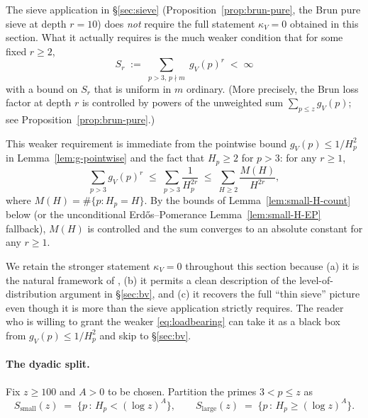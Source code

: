 \begin{remark}[Load-bearing requirement is weaker than $\kappa_{V} = 0$]
\label{rem:loadbearing}
The sieve application in \S\ref{sec:sieve}
(Proposition~\ref{prop:brun-pure}, the Brun pure sieve at depth $r = 10$)
does \emph{not} require the full statement $\kappa_{V} = 0$ obtained in
this section. What it actually requires is the much weaker condition
that for some fixed $r \geq 2$,
\begin{equation}\label{eq:loadbearing}
  S_{r} \;:=\; \sum_{p > 3, \, p \nmid m}\; g_{V}(p)^{r} \;<\; \infty
\end{equation}
with a bound on $S_{r}$ that is uniform in $m$ ordinary. (More precisely,
the Brun loss factor at depth $r$ is controlled by powers of the
unweighted sum $\sum_{p \leq z} g_{V}(p)$; see
Proposition~\ref{prop:brun-pure}.)

This weaker requirement is immediate from the pointwise bound
$g_{V}(p) \leq 1/H_{p}^{2}$ in Lemma~\ref{lem:g-pointwise} and the
fact that $H_{p} \geq 2$ for $p > 3$: for any $r \geq 1$,
\begin{equation}
  \sum_{p > 3} g_{V}(p)^{r}
  \;\leq\; \sum_{p > 3} \frac{1}{H_{p}^{2r}}
  \;\leq\; \sum_{H \geq 2} \frac{M(H)}{H^{2r}},
\end{equation}
where $M(H) = \#\{p : H_{p} = H\}$. By the bounds of
Lemma~\ref{lem:small-H-count} below (or the unconditional
Erd\H{o}s--Pomerance Lemma~\ref{lem:small-H-EP} fallback), $M(H)$ is
controlled and the sum converges to an absolute constant for any
$r \geq 1$.

We retain the stronger statement $\kappa_{V} = 0$ throughout this
section because (a) it is the natural framework of
\cite{HalberstamRichert1974}, (b) it permits a clean description of
the level-of-distribution argument in \S\ref{sec:bv}, and (c) it
recovers the full ``thin sieve'' picture even though it is more than
the sieve application strictly requires. The reader who is willing to
grant the weaker \eqref{eq:loadbearing} can take it as a black box
from $g_{V}(p) \leq 1/H_{p}^{2}$ and skip to \S\ref{sec:bv}.
\end{remark}

\paragraph{The dyadic split.}

Fix $z \geq 100$ and $A > 0$ to be chosen. Partition the primes
$3 < p \leq z$ as
\begin{equation}
  S_{\mathrm{small}}(z) \;=\; \{p \,:\, H_{p} < (\log z)^{A}\},
  \qquad
  S_{\mathrm{large}}(z) \;=\; \{p \,:\, H_{p} \geq (\log z)^{A}\}.
\end{equation}

